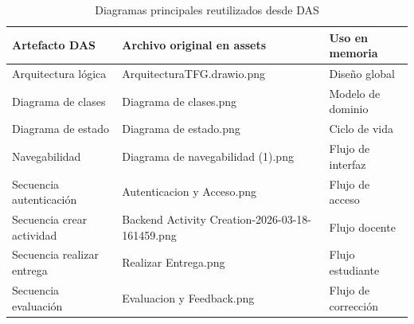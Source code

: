 \begin{table}[!htbp]
\centering
\small
\begin{tabular}{|P{3.5cm}|P{5.5cm}|P{2.8cm}|}
\hline
\textbf{Artefacto DAS} & \textbf{Archivo original en assets} & \textbf{Uso en memoria} \\
\hline
Arquitectura l\'ogica & ArquitecturaTFG.drawio.png & Dise\~no global \\
\hline
Diagrama de clases & Diagrama de clases.png & Modelo de dominio \\
\hline
Diagrama de estado & Diagrama de estado.png & Ciclo de vida \\
\hline
Navegabilidad & Diagrama de navegabilidad (1).png & Flujo de interfaz \\
\hline
Secuencia autenticaci\'on & Autenticacion y Acceso.png & Flujo de acceso \\
\hline
Secuencia crear actividad & Backend Activity Creation-2026-03-18-161459.png & Flujo docente \\
\hline
Secuencia realizar entrega & Realizar Entrega.png & Flujo estudiante \\
\hline
Secuencia evaluaci\'on & Evaluacion y Feedback.png & Flujo de correcci\'on \\
\hline
\end{tabular}
\normalsize
\caption{Diagramas principales reutilizados desde DAS}
\label{tab:das-diagramas-principales}
\end{table}








